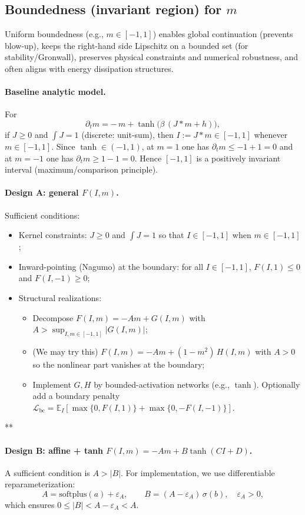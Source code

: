 \documentclass[11pt,a4paper]{article}
\theoremstyle{plain}
\theoremstyle{definition}
\theoremstyle{remark}
\begin{document}
\subsection{Boundedness (invariant region) for $m$}

Uniform boundedness (e.g., $m\in[-1,1]$) enables global continuation (prevents blow-up), keeps the right-hand side Lipschitz on a bounded set (for stability/Gronwall), preserves physical constraints and numerical robustness, and often aligns with energy dissipation structures.

\paragraph{Baseline analytic model.} For
\[
	\partial_t m = -\,m + \tanh\!\big( \beta\,(J* m + h) \big),
\]
if $J\ge 0$ and $\int J = 1$ (discrete: unit-sum), then $I:=J*m\in[-1,1]$ whenever $m\in[-1,1]$. Since $\tanh\in(-1,1)$, at $m=1$ one has $\partial_t m\le -1+1=0$ and at $m=-1$ one has $\partial_t m\ge 1-1=0$. Hence $[-1,1]$ is a positively invariant interval (maximum/comparison principle).

\paragraph{Design A: general $F(I,m)$.} Sufficient conditions:
\begin{itemize}
	\item Kernel constraints: $J\ge0$ and $\int J=1$ so that $I\in[-1,1]$ when $m\in[-1,1]$;
	\item Inward-pointing (Nagumo) at the boundary: for all $I\in[-1,1]$, $F(I,1)\le0$ and $F(I,-1)\ge0$;
	\item Structural realizations:
	      \begin{itemize}
		      \item Decompose $F(I,m)= -A m + G(I,m)$ with $A> \sup_{I,m\in[-1,1]} |G(I,m)|$;
		      \item (We may try this) $F(I,m)= -A m + (1-m^2)\,H(I,m)$ with $A>0$ so the nonlinear part vanishes at the boundary;
		      \item Implement $G,H$ by bounded-activation networks (e.g., $\tanh$). Optionally add a boundary penalty $\mathcal{L}_{\mathrm{bc}}=\mathbb{E}_I[\max\{0,F(I,1)\}+\max\{0,-F(I,-1)\}]$.
	      \end{itemize}
\end{itemize}


**\paragraph{Design B: affine + tanh $F(I,m)= -A m + B\tanh(C I + D)$.}
A sufficient condition is $A > |B|$.
For implementation, we use differentiable reparameterization:
$$
	A=\mathrm{softplus}(a)+\varepsilon_A,\qquad
	B=(A-\varepsilon_A)\,\sigma(b),\quad \varepsilon_A>0,
$$
which ensures $0\le |B|<A-\varepsilon_A<A$.
\end{document}
